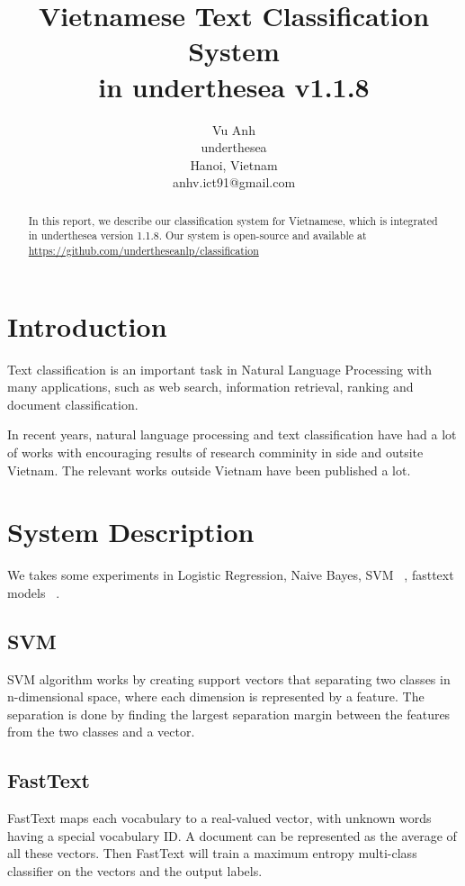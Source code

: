 \documentclass[11pt,a4paper]{article}
\title{Vietnamese Text Classification System \\ in underthesea v1.1.8}
\author{
Vu Anh\\
underthesea\\
Hanoi, Vietnam\\
anhv.ict91@gmail.com
}
\date{}
\begin{document}
\maketitle
\begin{abstract}
In this report, we describe our classification system for Vietnamese, which is integrated in underthesea version 1.1.8. Our system is open-source and available at
\href{https://github.com/undertheseanlp/classification}{https://github.com/undertheseanlp/classification}

\end{abstract}

\section{Introduction}

Text classification is an important task in Natural Language Processing with many applications, such as web search, information retrieval, ranking and document classification.

In recent years, natural language processing and text classification have had a lot of works with encouraging results of research comminity in side and outsite Vietnam. The relevant works outside Vietnam have been published a lot.

\section{System Description}

We takes some experiments in Logistic Regression, Naive Bayes, SVM ~\cite{Suykens1999}, fasttext models ~\cite{DBLP:journals/corr/JoulinGBM16}.

\subsection{SVM}

SVM algorithm works by creating support vectors that separating two classes in n-dimensional space, where each dimension is represented by a feature. The separation is done by finding the largest separation margin between  the features from the two classes and a vector.

\subsection{FastText}

FastText maps each vocabulary to a real-valued vector, with unknown words having a special vocabulary ID. A document can be represented as the average of all these vectors. Then FastText will train a maximum entropy multi-class classifier  on the vectors and the output labels.
\end{document}
